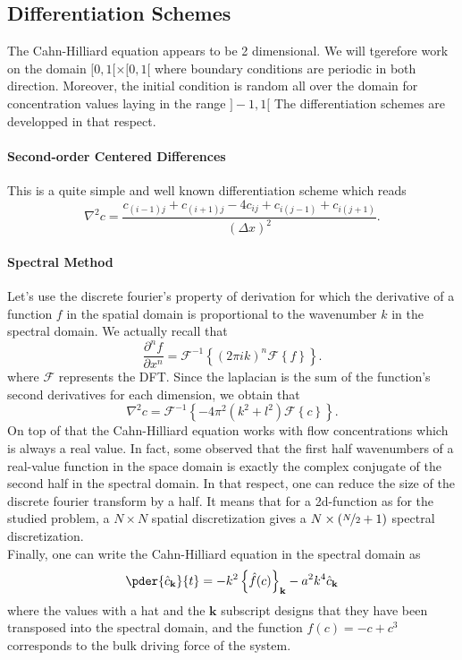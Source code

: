 \documentclass[10pt,a4paper,twocolumn]{article}
\begin{document}
\subsection{Differentiation Schemes} %
\label{sub:differentiation_schemes}

The Cahn-Hilliard equation appears to be 2 dimensional. We will tgerefore work on the domain $[0,1[ \times [0,1[$ where boundary conditions are periodic in both direction. Moreover, the initial condition is random all over the domain for concentration values laying in the range $]-1,1[$ The differentiation schemes are developped in that respect.

\paragraph{Second-order Centered Differences} This is a quite simple and well known differentiation scheme which reads
\begin{equation}
	\nabla^2 c = \frac{c_{(i-1)j} + c_{(i+1)j} - 4 c_{ij} + c_{i(j-1)} + c_{i(j+1)}}{(\Delta x)^2}.
\end{equation}

\paragraph{Spectral Method} Let's use the discrete fourier's property of derivation for which the derivative of a function $f$ in the spatial domain is proportional to the wavenumber $k$ in the spectral domain. We actually recall that
\begin{equation}
	\frac{\partial^n f}{\partial x^n} = \mathcal{F}^{-1} \left\{ (2\pi ik)^n \mathcal{F} \left\{ f \right\} \right\}.
\end{equation}
where $\mathcal F$ represents the DFT.
Since the laplacian is the sum of the function's second derivatives for each dimension, we obtain that
\begin{equation}
	\nabla^2 c = \mathcal{F}^{-1} \left\{ -4\pi^2(k^2+l^2) \mathcal{F} \left\{ c \right\} \right\}.
\end{equation}
On top of that the Cahn-Hilliard equation works with flow concentrations which is always a real value. In fact, some observed that the first half wavenumbers of a real-value function in the space domain is exactly the complex conjugate of the second half in the spectral domain. In that respect, one can reduce the size of the discrete fourier transform by a half. It means that for a 2d-function as for the studied problem, a $N \times N$ spatial discretization gives a $N \times (\nicefrac{N}{2}+1)$ spectral discretization.
\vspace{\baselineskip}\\
Finally, one can write the Cahn-Hilliard equation in the spectral domain as
\begin{equation}
	\pder{\hat c_\mathbf{k}}{t} = -k^2 \left\{ \hat f(c) \right\}_\mathbf{k} - a^2 k^4 \hat c_\mathbf{k}
\end{equation}
where the values with a hat and the $\mathbf{k}$ subscript designs that they have been transposed into the spectral domain, and the function $f(c) = -c + c^3$ corresponds to the bulk driving force of the system.
\end{document}
